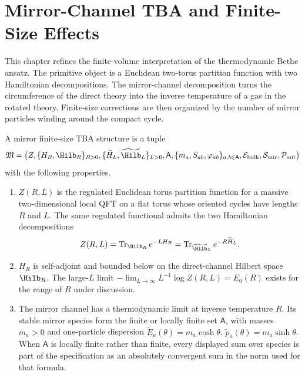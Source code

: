 \chapter{Mirror-Channel TBA and Finite-Size Effects}
\label{ch:integrable-mirror-channel-tba-finite-size-wrapping}

\ConventionsMixedCFT

This chapter refines the finite-volume interpretation of the thermodynamic
Bethe ansatz.  The primitive object is a Euclidean two-torus partition
function with two Hamiltonian decompositions.  The mirror-channel
decomposition turns the circumference of the direct theory into the inverse
temperature of a gas in the rotated theory.  Finite-size corrections are then
organized by the number of mirror particles winding around the compact cycle.

\begin{hypothesis}
\label{hyp:mirror-finite-size-tba-datum}
A mirror finite-size TBA structure is a tuple
\[
  \mathfrak M
  =
  \bigl(
    Z,\{H_R,\Hilb_R\}_{R>0},
    \{\widetilde H_L,\widetilde{\Hilb}_L\}_{L>0},
    \mathsf A,\{m_a,S_{ab},\varphi_{ab}\}_{a,b\in\mathsf A},
    \mathcal E_{\rm bulk},
    \mathcal S_{\rm mir},
    \mathcal P_{\rm mir}
  \bigr)
\]
with the following properties.
\begin{enumerate}[label=\textnormal{(\roman*)}]
\item \(Z(R,L)\) is the regulated Euclidean torus partition function for a
  massive two-dimensional local QFT on a flat torus whose oriented cycles have
  lengths \(R\) and \(L\).  The same regulated functional admits the two
  Hamiltonian decompositions
  \[
    Z(R,L)=\operatorname{Tr}_{\Hilb_R}e^{-L H_R}
    =
    \operatorname{Tr}_{\widetilde{\Hilb}_L}e^{-R\widetilde H_L}.
  \]
\item \(H_R\) is self-adjoint and bounded below on the direct-channel Hilbert
  space \(\Hilb_R\).  The large-\(L\) limit
  \(-\lim_{L\to\infty}L^{-1}\log Z(R,L)=E_0(R)\) exists for the range of
  \(R\) under discussion.
\item The mirror channel has a thermodynamic limit at inverse temperature
  \(R\).  Its stable mirror species form the finite or locally finite set
  \(\mathsf A\), with masses \(m_a>0\) and one-particle dispersion
  \(\widetilde E_a(\theta)=m_a\cosh\theta\),
  \(\widetilde p_a(\theta)=m_a\sinh\theta\).  When \(\mathsf A\) is locally
  finite rather than finite, every displayed sum over species is part of the
  specification as an absolutely convergent sum in the norm used for that formula.

\end{enumerate}
\end{hypothesis}
